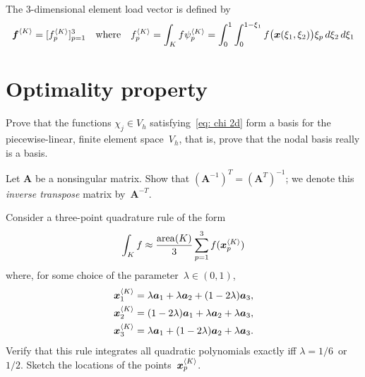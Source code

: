 The 3-dimensional element load vector is defined by
\[
\boldsymbol{f}^{\langle K\rangle}=[f^{\langle K\rangle}_p]_{p=1}^3
\quad\text{where}\quad
f^{\langle K\rangle}_p=\int_K f\psi^{\langle K\rangle}_p
	=\int_0^1\int_0^{1-\xi_1}f\bigl(\boldsymbol{x}(\xi_1,\xi_2)\bigr)\xi_p
	\,d\xi_2 \,d\xi_1
\]




\section{Optimality property}

\begin{Exercises}

\exercise\label{ex: nodal basis}
Prove that the functions $\chi_j\in V_h$ satisfying~\eqref{eq: chi 2d} form a 
basis for the piecewise-linear, finite element space~$V_h$, that is, prove that 
the nodal basis really is a basis. 

\exercise\label{ex: inv transpose}
Let $\boldsymbol{A}$ be a nonsingular matrix.
Show that $(\boldsymbol{A}^{-1})^T=(\boldsymbol{A}^T)^{-1}$; we denote this 
\emph{inverse transpose} matrix by~$\boldsymbol{A}^{-T}$.

\exercise
Consider a three-point quadrature rule of the form
\[
\int_Kf\approx\frac{\mathrm{area}(K)}{3}\sum_{p=1}^3 
    f(\boldsymbol{x}^{\langle K\rangle}_p)
\]
where, for some choice of the parameter~$\lambda\in(0,1)$, 
\begin{align*}
\boldsymbol{x}^{\langle K\rangle}_1=\lambda\boldsymbol{a}_1+\lambda\boldsymbol{a}_2
    +(1-2\lambda)\boldsymbol{a}_3,\\
\boldsymbol{x}^{\langle K\rangle}_2=(1-2\lambda)\boldsymbol{a}_1+\lambda\boldsymbol{a}_2
    +\lambda\boldsymbol{a}_3,\\
\boldsymbol{x}^{\langle K\rangle}_3=\lambda\boldsymbol{a}_1+(1-2\lambda)\boldsymbol{a}_2
    +\lambda\boldsymbol{a}_3.
\end{align*}
Verify that this rule integrates all quadratic polynomials exactly iff
$\lambda=1/6$~or $1/2$.  Sketch the locations of the 
points~$\boldsymbol{x}^{\langle K\rangle}_p$.


\end{Exercises}

